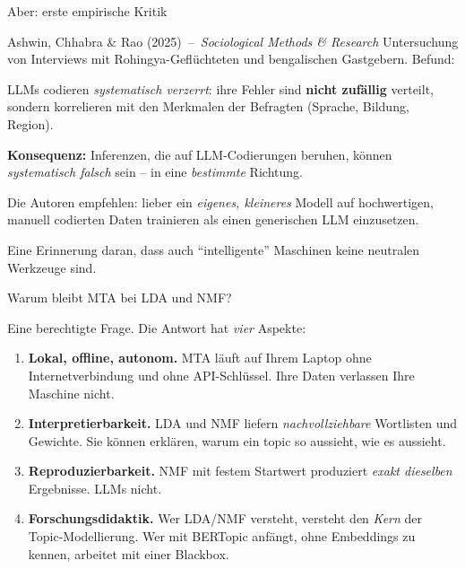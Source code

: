 \documentclass[aspectratio=169,11pt]{beamer}
\newcommand{\mdash}{\,{\monodash–}\,}
\let\oldemph\emph
\renewcommand{\emph}[1]{{\color{solCyan}\oldemph{#1}}}
\let\oldtextbf\textbf
\renewcommand{\textbf}[1]{{\color{solBase3}\oldtextbf{#1}}}
\begin{document}
\begin{frame}{Aber: erste empirische Kritik}

  \begin{block}{Ashwin, Chhabra \& Rao (2025) \mdash{} \emph{Sociological Methods \& Research}}
    Untersuchung von Interviews mit Rohingya-Geflüchteten und
    bengalischen Gastgebern. Befund:

    \vspace{2pt}
    LLMs codieren \emph{systematisch verzerrt}: ihre Fehler sind
    \textbf{nicht zufällig} verteilt, sondern korrelieren mit den
    Merkmalen der Befragten (Sprache, Bildung, Region).
  \end{block}

  \vfill
  \textbf{Konsequenz:} Inferenzen, die auf LLM-Codierungen beruhen,
  können \emph{systematisch falsch} sein – in eine \emph{bestimmte}
  Richtung.

  \vfill
  Die Autoren empfehlen: lieber ein \emph{eigenes, kleineres} Modell
  auf hochwertigen, manuell codierten Daten trainieren als einen
  generischen LLM einzusetzen.

  \vfill
  \footnotesize\color{black!60}
  Eine Erinnerung daran, dass auch \enquote{intelligente} Maschinen
  keine neutralen Werkzeuge sind.

\end{frame}

\begin{frame}{Warum bleibt MTA bei LDA und NMF?}

  Eine berechtigte Frage. Die Antwort hat \emph{vier} Aspekte:

  \vfill
  \begin{enumerate}
    \item \textbf{Lokal, offline, autonom.} MTA läuft auf Ihrem Laptop
          ohne Internetverbindung und ohne API-Schlüssel. Ihre Daten
          verlassen Ihre Maschine nicht.
    \vfill
    \item \textbf{Interpretierbarkeit.} LDA und NMF liefern \emph{nach\-voll\-zieh\-bare}
          Wortlisten und Gewichte. Sie können erklären, warum
          ein topic so aussieht, wie es aussieht.
    \vfill
    \item \textbf{Reproduzierbarkeit.} NMF mit festem Startwert
          produziert \emph{exakt dieselben} Ergebnisse. LLMs nicht.
    \vfill
    \item \textbf{Forschungsdidaktik.} Wer LDA/NMF versteht,
          versteht den \emph{Kern} der Topic-Modellierung. Wer mit
          BERTopic anfängt, ohne Embeddings zu kennen, arbeitet mit
          einer Blackbox.
  \end{enumerate}

\end{frame}
\end{document}
